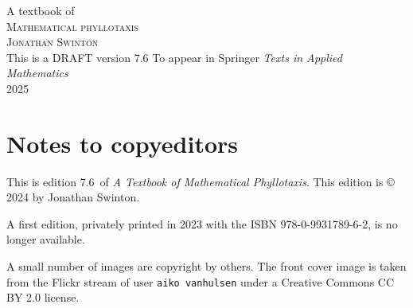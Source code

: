 \documentclass[a4paper,12pt,landscape,british,oneside]{memoir}
\newcommand{\jdraftnumber}{7.6}
\newcommand{\jPublicationYear}{2025}
\begin{document}
%
%

\thispagestyle{titlingpage}
{
	{}	
	\centering
	{\Huge A textbook of }
	\\[3ex]
	{\HUGE\jEmphasisColour	\textsc{Mathematical phyllotaxis}}\\
	\vfill
	{\Huge	\scshape Jonathan Swinton}
	\\\vfill{\jEmphasisColour This is a DRAFT version \jdraftnumber{}}
	\vfill
	{\Large	To appear in Springer \textit{Texts in Applied Mathematics}}
	\\[3ex]
	{\Large \textsc{\jPublicationYear}
		\\}
}
\newpage
\thispagestyle{titlingpage}


\chapter*{Notes to copyeditors}
This is edition \jdraftnumber\  of \textit{A Textbook of Mathematical Phyllotaxis}. This edition is © 2024 by Jonathan Swinton.

A first edition, privately printed in 2023 with the ISBN 978-0-9931789-6-2, is no longer available. 

A small number of images are copyright by others.  The front cover image is taken from the Flickr stream of user \texttt{aiko vanhulsen} under a Creative Commons CC BY 2.0 license. 
\end{document}
